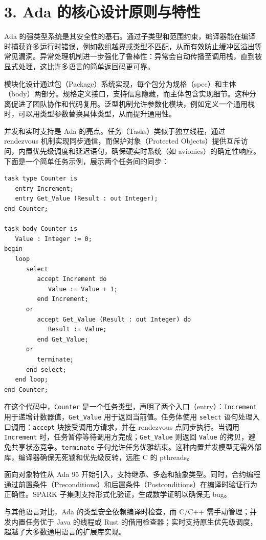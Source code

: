 \chapter{3. Ada 的核心设计原则与特性}
Ada 的强类型系统是其安全性的基石。通过子类型和范围约束，编译器能在编译时捕获许多运行时错误，例如数组越界或类型不匹配，从而有效防止缓冲区溢出等常见漏洞。异常处理机制进一步强化了鲁棒性：异常会自动传播至调用栈，直到被显式处理，这比许多语言的简单返回码更可靠。\par
模块化设计通过包（Package）系统实现，每个包分为规格（spec）和主体（body）两部分。规格定义接口，支持信息隐藏，而主体包含实现细节。这种分离促进了团队协作和代码复用。泛型机制允许参数化模块，例如定义一个通用栈时，可以用类型参数替换具体类型，从而提升通用性。\par
并发和实时支持是 Ada 的亮点。任务（Tasks）类似于独立线程，通过 rendezvous 机制实现同步通信，而保护对象（Protected Objects）提供互斥访问，内置优先级调度和延迟语句，确保硬实时系统（如 avionics）的确定性响应。下面是一个简单任务示例，展示两个任务间的同步：\par
\begin{lstlisting}
task type Counter is
   entry Increment;
   entry Get_Value (Result : out Integer);
end Counter;

task body Counter is
   Value : Integer := 0;
begin
   loop
      select
         accept Increment do
            Value := Value + 1;
         end Increment;
      or
         accept Get_Value (Result : out Integer) do
            Result := Value;
         end Get_Value;
      or
         terminate;
      end select;
   end loop;
end Counter;
\end{lstlisting}
在这个代码中，\texttt{Counter} 是一个任务类型，声明了两个入口（entry）：\texttt{Increment} 用于递增计数器值，\texttt{Get\_{}Value} 用于返回当前值。任务体使用 \texttt{select} 语句处理入口调用：\texttt{accept} 块接受调用方请求，并在 rendezvous 点同步执行。当调用 \texttt{Increment} 时，任务暂停等待调用方完成；\texttt{Get\_{}Value} 则返回 \texttt{Value} 的拷贝，避免共享状态竞争。\texttt{terminate} 子句允许任务优雅结束。这种内置并发模型无需外部库，编译器确保无死锁和优先级反转，远胜 C 的 pthreads。\par
面向对象特性从 Ada 95 开始引入，支持继承、多态和抽象类型。同时，合约编程通过前置条件（Preconditions）和后置条件（Postconditions）在编译时验证行为正确性。SPARK 子集则支持形式化验证，生成数学证明以确保无 bug。\par
与其他语言对比，Ada 的类型安全依赖编译时检查，而 C/C++ 需手动管理；并发内置任务优于 Java 的线程或 Rust 的借用检查器；实时支持原生优先级调度，超越了大多数通用语言的扩展库实现。\par

